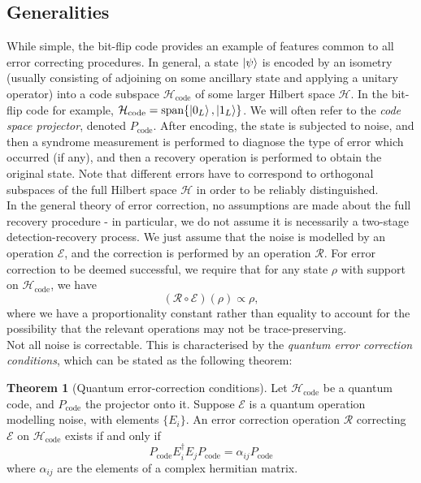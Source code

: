 \documentclass[12pt,a4paper]{report}
\numberwithin{equation}{section}
\newcommand{\Pc}{P_{\text{code}}}
\newcommand{\Hcode}{\mathcal{H}_{\text{code}}}
\theoremstyle{definition}
\theoremstyle{theorem}
\newtheorem{theorem}{Theorem}[section]
\theoremstyle{theorem}
\theoremstyle{example}
\theoremstyle{definition}
\begin{document}
\subsection{Generalities}
While simple, the bit-flip code provides an example of features common to all error correcting procedures. In general, a state $\ket{\psi}$ is encoded by an isometry (usually consisting of adjoining on some ancillary state and applying a unitary operator) into a code subspace $\Hcode$ of some larger Hilbert space $\mathcal{H}$. In the bit-flip code for example, $\Hcode=\text{span}\{\ket{0_{L}},\ket{1_{L}}\}$. We will often refer to the \textit{code space projector}, denoted $\Pc$. After encoding, the state is subjected to noise, and then a syndrome measurement is performed to diagnose the type of error which occurred (if any), and then a recovery operation is performed to obtain the original state. Note that different errors have to correspond to orthogonal subspaces of the full Hilbert space $\mathcal{H}$ in order to be reliably distinguished.\\
In the general theory of error correction, no assumptions are made about the full recovery procedure - in particular, we do not assume it is necessarily a two-stage detection-recovery process. We just assume that the noise is modelled by an operation $\mathcal{E}$, and the correction is performed by an operation $\mathcal{R}$. For error correction to be deemed successful, we require that for any state $\rho$ with support on $\Hcode$, we have
\begin{equation}
	(\mathcal{R}\circ\mathcal{E})(\rho)\propto\rho,
\end{equation}
where we have a proportionality constant rather than equality to account for the possibility that the relevant operations may not be trace-preserving.\\
Not all noise is correctable. This is characterised by the \textit{quantum error correction conditions}, which can be stated as the following theorem:
\begin{theorem}[Quantum error-correction conditions]
	Let $\Hcode$ be a quantum code, and $\Pc$ the projector onto it. Suppose $\mathcal{E}$ is a quantum operation modelling noise, with elements $\{E_{i}\}$. An error correction operation $\mathcal{R}$ correcting $\mathcal{E}$ on $\Hcode$ exists if and only if
	\begin{equation}
		\Pc E_{i}^{\dagger}E_{j}\Pc=\alpha_{ij}\Pc
	\end{equation}
	where $\alpha_{ij}$ are the elements of a complex hermitian matrix.
\end{theorem}
\end{document}

